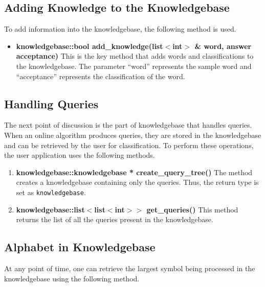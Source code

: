 \subsection*{Adding Knowledge to the Knowledgebase} 
To add information into the knowledgebase, the following method is used.
\begin{itemize}
\item \textbf{knowledgebase::bool add\_knowledge(list$<$int$>$ \& word, answer acceptance)} \vskip 1pt
This is the key method that adds words and classifications to the knowledgebase. The parameter ``word'' represents the sample word and ``acceptance'' represents the classification of the word. 
\end{itemize}	

\subsection*{Handling Queries}
The next point of discussion is the part of knowledgebase that handles queries. When an online algorithm produces queries, they are stored in the knowledgebase and can be retrieved by the user for classification. To perform these operations, the user application uses the following methods.

\begin{enumerate}
\item \textbf{knowledgebase::knowledgebase * create\_query\_tree()} \vskip 1pt
The method creates a knowledgebase containing only the queries. Thus, the return type is set as \texttt{knowledgebase}.
	
\item \textbf{knowledgebase::list$<$list$<$int$>$$>$ get\_queries()} \vskip 1pt
This method returns the list of all the queries present in the knowledgebase.

\end{enumerate}

\subsection*{Alphabet in Knowledgebase}
At any point of time, one can retrieve the largest symbol being processed in the knowledgebase using the following method.


